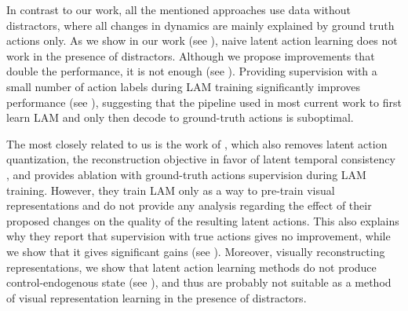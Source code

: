 In contrast to our work, all the mentioned approaches \citep{schmidt2023learning, ye2024latent, cui2024dynamo, chen2024moto} use data without distractors, where all changes in dynamics are mainly explained by ground truth actions only. As we show in our work (see ), naive latent action learning does not work in the presence of distractors. Although we propose improvements that double the performance, it is not enough (see ). Providing supervision with a small number of action labels during LAM training significantly improves performance (see ), suggesting that the pipeline used in most current work \citep{ye2024latent, cui2024dynamo, chen2024moto} to first learn LAM and only then decode to ground-truth actions is suboptimal. 

The most closely related to us is the work of \citet{cui2024dynamo}, which also removes latent action quantization, the reconstruction objective in favor of latent temporal consistency \citep{schwarzer2020data, zhao2023simplified}, and provides ablation with ground-truth actions supervision during LAM training. However, they train LAM only as a way to pre-train visual representations and do not provide any analysis regarding the effect of their proposed changes on the quality of the resulting latent actions. This also explains why they report that supervision with true actions gives no improvement, while we show that it gives significant gains (see ). Moreover, visually reconstructing representations, we show that latent action learning methods do not produce control-endogenous state (see ), and thus are probably not suitable as a method of visual representation learning in the presence of distractors.